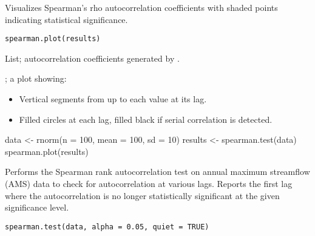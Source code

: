 \documentclass[a4paper]{book}
\begin{document}
%
\begin{Description}
Visualizes Spearman’s rho autocorrelation coefficients with
shaded points indicating statistical significance.
\end{Description}
%
\begin{Usage}
\begin{verbatim}
spearman.plot(results)
\end{verbatim}
\end{Usage}
%
\begin{Arguments}
\begin{ldescription}
\item[\code{results}] List; autocorrelation coefficients generated by .
\end{ldescription}
\end{Arguments}
%
\begin{Value}
; a plot showing:
\begin{itemize}

\item{} Vertical segments from  up to each \eqn{\rho}{} value at its lag.
\item{} Filled circles at each lag, filled black if serial correlation is detected.

\end{itemize}

\end{Value}
%
\begin{Examples}
\begin{ExampleCode}
data <- rnorm(n = 100, mean = 100, sd = 10)
results <- spearman.test(data)
spearman.plot(results)

\end{ExampleCode}
\end{Examples}
%
\begin{Description}
Performs the Spearman rank autocorrelation test on annual maximum streamflow (AMS) data to
check for autocorrelation at various lags. Reports the first lag where the autocorrelation
is no longer statistically significant at the given significance level.
\end{Description}
%
\begin{Usage}
\begin{verbatim}
spearman.test(data, alpha = 0.05, quiet = TRUE)
\end{verbatim}
\end{Usage}
\end{document}
